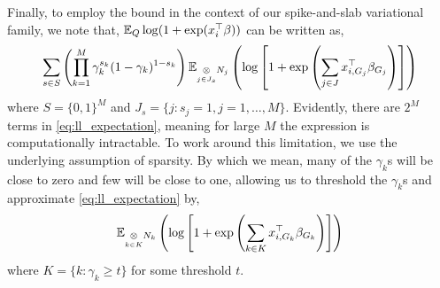 \break

Finally, to employ the bound in the context of our spike-and-slab variational family, we note that, $\mathbb{E}_Q \log ( 1 + \exp (x_i^\top \beta))$ can be written as,
\begin{equation} \label{eq:ll_expectation}
    \sum_{s \in S} \left( 
	\prod_{k=1}^M \gamma_k^{s_k} (1- \gamma_k )^{1- s_k} 
    \right)
    \mathbb{E}_{\underset{j \in J_s}{\otimes} N_j}
    \left( 
	\log \left[ 1 + \exp \left( \sum_{j \in J} x^\top_{i, G_j} \beta_{G_j} \right) \right] 
    \right)
\end{equation}
where $ S = \{0, 1\}^{M}$ and $J_s = \{j : s_j = 1, j=1,\dots,M \}$. Evidently, there are $2^M$ terms in \eqref{eq:ll_expectation}, meaning for large $M$ the expression is computationally intractable. To work around this limitation, we use the underlying assumption of sparsity. By which we mean, many of the $\gamma_k$s will be close to zero and few will be close to one, allowing us to threshold the $\gamma_k$s and approximate \eqref{eq:ll_expectation} by,
\begin{equation}
    \mathbb{E}_{\underset{k \in K}{\otimes} N_k}
    \left( 
	\log \left[ 1 + \exp \left( \sum_{k \in K} x^\top_{i, G_k} \beta_{G_k} \right) \right] 
    \right)
\end{equation}
where $K = \{k : \gamma_k \geq t \}$ for some threshold $t$.





